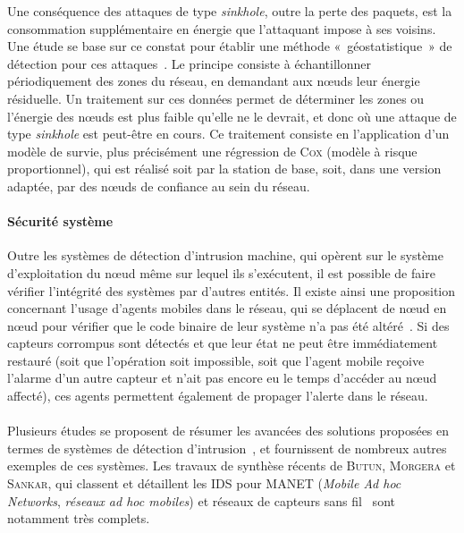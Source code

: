 Une conséquence des attaques de type \textit{sinkhole}, outre la perte des paquets, est la consommation supplémentaire en énergie que l'attaquant impose à ses voisins.
Une étude se base sur ce constat pour établir une méthode « géostatistique » de détection pour ces attaques~\cite{SKDM14}.
Le principe consiste à échantillonner périodiquement des zones du réseau, en demandant aux nœuds leur énergie résiduelle.
Un traitement sur ces données permet de déterminer les zones ou l'énergie des nœuds est plus faible qu'elle ne le devrait, et donc où une attaque de type \textit{sinkhole} est peut-être en cours.
Ce traitement consiste en l'application d'un modèle de survie, plus précisément une régression de C\textsc{ox} (modèle à risque proportionnel), qui est réalisé soit par la station de base, soit, dans une version adaptée, par des nœuds de confiance au sein du réseau.

        \paragraph{Sécurité système}
Outre les systèmes de détection d'intrusion machine, qui opèrent sur le système d'exploitation du nœud même sur lequel ils s'exécutent, il est possible de faire vérifier l'intégrité des systèmes par d'autres entités.
Il existe ainsi une proposition concernant l'usage d'agents mobiles dans le réseau, qui se déplacent de nœud en nœud pour vérifier que le code binaire de leur système n'a pas été altéré~\cite{HR13}.
Si des capteurs corrompus sont détectés et que leur état ne peut être immédiatement restauré (soit que l'opération soit impossible, soit que l'agent mobile reçoive l'alarme d'un autre capteur et n'ait pas encore eu le temps d'accéder au nœud affecté), ces agents permettent également de propager l'alerte dans le réseau.

        \paragraph{}
Plusieurs études se proposent de résumer les avancées des solutions proposées en termes de systèmes de détection d'intrusion~\cite{ME13,MS14}, et fournissent de nombreux autres exemples de ces systèmes.
Les travaux de synthèse récents de \textsc{Butun, Morgera} et \textsc{Sankar}, qui classent et détaillent les IDS pour MANET (\textit{Mobile Ad hoc Networks}, \textit{réseaux ad hoc mobiles}) et réseaux de capteurs sans fil~\cite{BMS13} sont notamment très complets.
